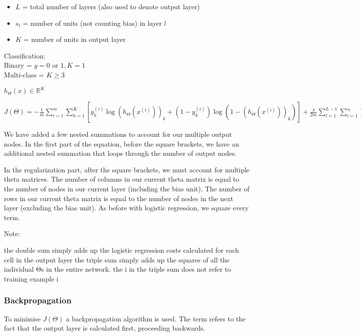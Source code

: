 \documentclass[12pt] {article}
\begin{document}
      \begin{itemize}
        \item $L$ = total number of layers (also used to denote output layer)
        \item $s_l$ = number of units (not counting bias) in layer $l$
        \item $K$ = number of units in output layer
      \end{itemize}{
      
      Classification:\\
      Binary = $y = 0 \text{ or } 1, K = 1$\\
      Multi-class = $K \geq 3$

      $h_\Theta(x) \in \mathbb{R}^K$

      $J(\Theta) = -\frac{1}{m} \displaystyle\sum_{i=1}^m \displaystyle
      \sum_{k=1}^K \left[y_k^{(i)} \log(h_\Theta(x^{(i)}))_k + (1-y_k^{(i)})
      \log(1-(h_\Theta(x^{(i)}))_k)\right] + \frac{\lambda}{2m} \displaystyle
      \sum_{l=1}^{L-1} \displaystyle\sum_{i=1}^{s_l} \displaystyle
      \sum_{j=1}^{s_l+1} (\Theta_{ji}^{(l)})^2$

      We have added a few nested summations to account for our multiple output nodes. In the first part of the equation, before the square brackets, we have an additional nested summation that loops through the number of output nodes.

      In the regularization part, after the square brackets, we must account for multiple theta matrices. The number of columns in our current theta matrix is equal to the number of nodes in our current layer (including the bias unit). The number of rows in our current theta matrix is equal to the number of nodes in the next layer (excluding the bias unit). As before with logistic regression, we square every term.

      Note:

      the double sum simply adds up the logistic regression costs calculated for each cell in the output layer
      the triple sum simply adds up the squares of all the individual Θs in the entire network.
      the i in the triple sum does not refer to training example i


    \subsubsection{Backpropagation}

      To minimise $J(\Theta)$ a backpropagation algorithm is used. The term
      refers to the fact that the output layer is calculated first, proceeding
      backwards.

}
\end{document}
